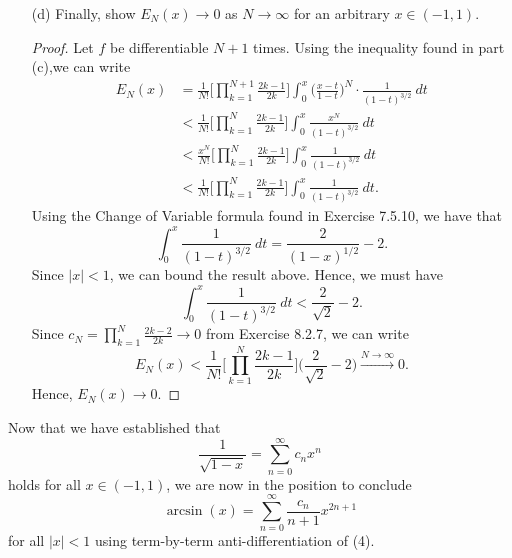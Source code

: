 \begin{enumerate}
\begin{proof}[Solution]
        \end{proof}
    \item[(d)] Finally, show \( E_{N}(x) \to 0  \) as \( N \to \infty  \) for an arbitrary \( x \in (-1 , 1) \).
        \begin{proof}
        Let \( f  \) be differentiable \( N + 1  \) times. Using the inequality found in part (c),we can write 
        \begin{align*}
            E_{N}(x) &= \frac{ 1 }{ N! }  \Big[ \prod_{k=1}^{N+1}  \frac{ 2k - 1  }{ 2k  } \Big] \int_{ 0 }^{ x  }  \Big( \frac{ x -t  }{ 1 - t  }  \Big)^{N } \cdot \frac{ 1 }{ (1-t)^{3/2} } \  dt   \\
                     &< \frac{ 1 }{ N! } \Big[ \prod_{k=1}^{N} \frac{ 2k - 1  }{ 2k  } \Big]  \int_{ 0 }^{ x }  \frac{ x^{N} }{  (1-t)^{3/2} } \  dt \\
                     &< \frac{ x^{N} }{ N! }  \Big[ \prod_{k=1}^{N} \frac{ 2k - 1  }{ 2k  }\Big] \int_{ 0 }^{ x  }  \frac{ 1 }{ (1-t)^{3/2} } \  dt \\
                     &< \frac{ 1 }{ N! }  \Big[ \prod_{k=1}^{N} \frac{ 2k - 1  }{ 2k  }\Big] \int_{ 0 }^{ x }  \frac{ 1 }{ (1-t)^{3/2} } \  dt.
        \end{align*}
        Using the Change of Variable formula found in Exercise 7.5.10, we have that 
        \[  \int_{ 0 }^{ x }  \frac{ 1 }{ (1-t)^{3/2} } \  dt = \frac{ 2 }{ (1-x)^{1/2} } - 2.  \]
        Since \( | x  | < 1  \), we can bound the result above. Hence, we must have 
        \[  \int_{ 0 }^{ x }  \frac{ 1 }{ (1-t)^{3/2}  } \ dt < \frac{ 2 }{ \sqrt{ 2 }  } - 2.  \]
        Since \( c_{N} = \prod_{k=1}^{N} \frac{ 2k-2 }{ 2k } \to 0  \) from Exercise 8.2.7, we can write
        \[  E_{N}(x) < \frac{ 1 }{ N! } \Big[ \prod_{k=1}^{N} \frac{ 2k-1 }{ 2k }  \Big] \Big( \frac{ 2 }{ \sqrt{ 2 }  }  - 2  \Big) \xrightarrow{N\rightarrow\infty} 0.  \]
        Hence, \( E_{N}(x) \to 0  \).
        \end{proof}
\end{enumerate}
Now that we have established that 
\[  \frac{ 1 }{ \sqrt{ 1 - x  }  }  = \sum_{ n=0 }^{ \infty  } c_{n} x^{n} \tag{4}  \] holds for all \( x \in (-1,1 ) \), we are now in the position to conclude 
\[  \arcsin(x) = \sum_{ n=0  }^{ \infty  } \frac{ c_{n} }{  n+1  } x^{2n+1}  \] for all \( |  x  |  < 1  \) using term-by-term anti-differentiation of (4).

